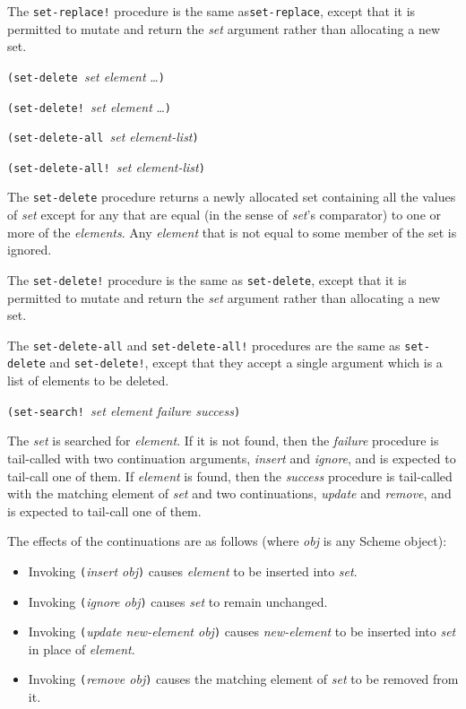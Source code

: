 The \texttt{set-replace!} procedure is the same as\texttt{set-replace},
except that it is permitted to mutate and return the \emph{set} argument
rather than allocating a new set.

\texttt{(set-delete\ }\emph{set element} \ldots{}\texttt{)}

\texttt{(set-delete!\ }\emph{set element} \ldots{}\texttt{)}

\texttt{(set-delete-all\ }\emph{set element-list}\texttt{)}

\texttt{(set-delete-all!\ }\emph{set element-list}\texttt{)}

The \texttt{set-delete} procedure returns a newly allocated set
containing all the values of \emph{set} except for any that are equal
(in the sense of \emph{set}'s comparator) to one or more of the
\emph{elements}. Any \emph{element} that is not equal to some member of
the set is ignored.

The \texttt{set-delete!} procedure is the same as \texttt{set-delete},
except that it is permitted to mutate and return the \emph{set} argument
rather than allocating a new set.

The \texttt{set-delete-all} and \texttt{set-delete-all!} procedures are
the same as \texttt{set-delete} and \texttt{set-delete!}, except that
they accept a single argument which is a list of elements to be deleted.

\texttt{(set-search!\ }\emph{set element failure success}\texttt{)}

The \emph{set} is searched for \emph{element}. If it is not found, then
the \emph{failure} procedure is tail-called with two continuation
arguments, \emph{insert} and \emph{ignore}, and is expected to tail-call
one of them. If \emph{element} is found, then the \emph{success}
procedure is tail-called with the matching element of \emph{set} and two
continuations, \emph{update} and \emph{remove}, and is expected to
tail-call one of them.

The effects of the continuations are as follows (where \emph{obj} is any
Scheme object):

\begin{itemize}
\item
  Invoking \texttt{(}\emph{insert obj}\texttt{)} causes \emph{element}
  to be inserted into \emph{set}.
\item
  Invoking \texttt{(}\emph{ignore obj}\texttt{)} causes \emph{set} to
  remain unchanged.
\item
  Invoking \texttt{(}\emph{update new-element obj}\texttt{)} causes
  \emph{new-element} to be inserted into \emph{set} in place of
  \emph{element}.
\item
  Invoking \texttt{(}\emph{remove obj}\texttt{)} causes the matching
  element of \emph{set} to be removed from it.
\end{itemize}

